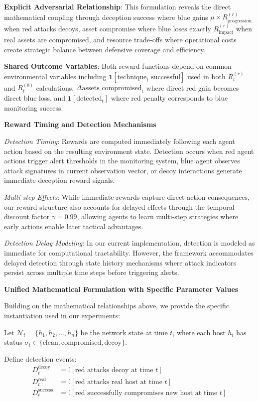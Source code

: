 \documentclass[12pt,oneside]{article}
\begin{document}
\textbf{Explicit Adversarial Relationship}: This formulation reveals the direct mathematical coupling through deception success where blue gains $\mu \times R^{(r)}_{\text{progression}}$ when red attacks decoys, asset compromise where blue loses exactly $R^{(r)}_{\text{impact}}$ when real assets are compromised, and resource trade-offs where operational costs create strategic balance between defensive coverage and efficiency.

\textbf{Shared Outcome Variables}: Both reward functions depend on common environmental variables including $\mathbf{1}[\text{technique}_i \text{ successful}]$ used in both $R^{(r)}_t$ and $R^{(b)}_t$ calculations, $\Delta\text{assets\_compromised}_t$ where direct red gain becomes direct blue loss, and $\mathbf{1}[\text{detected}_t]$ where red penalty corresponds to blue monitoring success.

\textbf{Reward Timing and Detection Mechanisms}

\textit{Detection Timing}: Rewards are computed immediately following each agent action based on the resulting environment state. Detection occurs when red agent actions trigger alert thresholds in the monitoring system, blue agent observes attack signatures in current observation vector, or decoy interactions generate immediate deception reward signals.

\textit{Multi-step Effects}: While immediate rewards capture direct action consequences, our reward structure also accounts for delayed effects through the temporal discount factor $\gamma = 0.99$, allowing agents to learn multi-step strategies where early actions enable later tactical advantages.

\textit{Detection Delay Modeling}: In our current implementation, detection is modeled as immediate for computational tractability. However, the framework accommodates delayed detection through state history mechanisms where attack indicators persist across multiple time steps before triggering alerts.

\textbf{Unified Mathematical Formulation with Specific Parameter Values}

Building on the mathematical relationships above, we provide the specific instantiation used in our experiments:

Let $\mathcal{N}_t = \{h_1, h_2, \ldots, h_n\}$ be the network state at time $t$, where each host $h_i$ has status $\sigma_i \in \{\text{clean}, \text{compromised}, \text{decoy}\}$. 

Define detection events:
\begin{align}
D_t^{\text{decoy}} &= \mathbb{I}[\text{red attacks decoy at time } t] \\
D_t^{\text{real}} &= \mathbb{I}[\text{red attacks real host at time } t] \\
D_t^{\text{success}} &= \mathbb{I}[\text{red successfully compromises new host at time } t]
\end{align}
\end{document}
